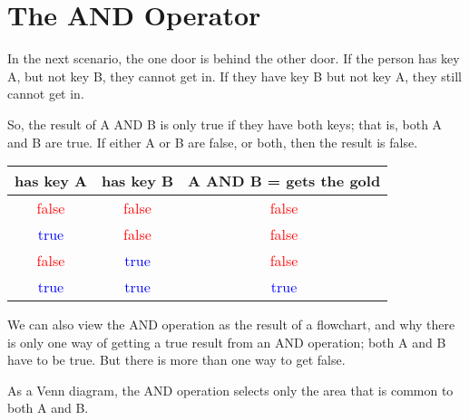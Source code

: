 \begin{center} \end{center}

\section{The AND Operator}

In the next scenario, the one door is behind the other door. If the person has key A, but not key B, they cannot get in. If they have key B but not key A, they still cannot get in. \\

\begin{center} \end{center}

So, the result of A AND B is only true if they have both keys; that is, both A and B are true. If either A or B are false, or both, then the result is false.

\begin{center}
	\begin{tabular}{c | c | c}
		has key A & has key B & A AND B = gets the gold \\ \hline
		\textcolor{red}{false} & \textcolor{red}{false} & \textcolor{red}{false}\\ \hline
		\textcolor{blue}{true} & \textcolor{red}{false} & \textcolor{red}{false} \\ \hline
		\textcolor{red}{false} & \textcolor{blue}{true} & \textcolor{red}{false} \\ \hline
		\textcolor{blue}{true} & \textcolor{blue}{true} & \textcolor{blue}{true} \\ \hline
	\end{tabular}
\end{center}

We can also view the AND operation as the result of a flowchart, and why there is only one way of getting a true result from an AND operation; both A and B have to be true. But there is more than one way to get false.

\begin{center} \end{center}


As a Venn diagram, the AND operation selects only the area that is common to both A and B.

\begin{center} \end{center}


